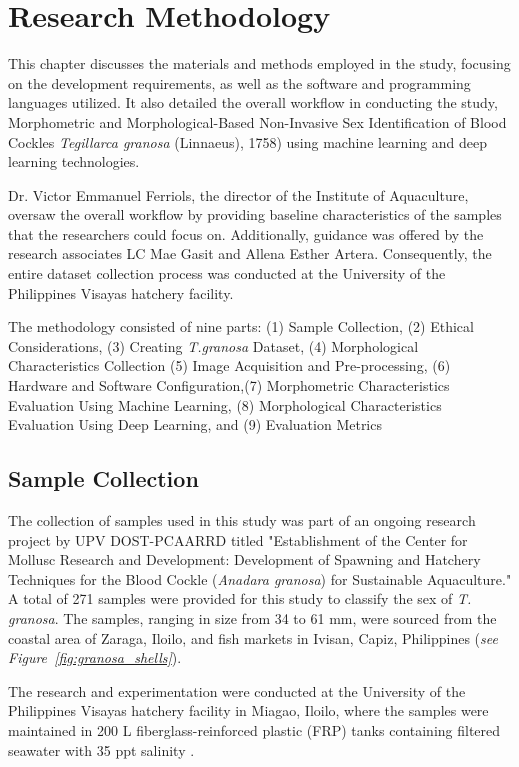 \chapter{Research Methodology}
\label{sec:methodology}

This chapter discusses the materials and methods employed in the study, focusing on the development requirements, as well as the software and programming languages utilized. It also detailed the overall workflow in conducting the study, Morphometric and Morphological-Based Non-Invasive Sex Identification of Blood Cockles \textit{Tegillarca granosa} (Linnaeus), 1758) using machine learning and deep learning technologies.

Dr. Victor Emmanuel Ferriols, the director of the Institute of Aquaculture, oversaw the overall workflow by providing baseline characteristics of the samples that the researchers could focus on. Additionally, guidance was offered by the research associates LC Mae Gasit and Allena Esther Artera. Consequently, the entire dataset collection process was conducted at the University of the Philippines Visayas hatchery facility.

The methodology consisted of nine parts: (1) Sample Collection, (2) Ethical Considerations, (3) Creating \textit{T.granosa} Dataset, (4) Morphological Characteristics Collection (5) Image Acquisition and Pre-processing, (6) Hardware and Software Configuration,(7) Morphometric Characteristics Evaluation Using Machine Learning, (8) Morphological Characteristics Evaluation Using Deep Learning, and (9) Evaluation Metrics

\section{Sample Collection}
\label{sec:samplecollect} 

The collection of \Tgranosa samples used in this study was part of an ongoing research project by UPV DOST-PCAARRD titled "Establishment of the Center for Mollusc Research and Development: Development of Spawning and Hatchery Techniques for the Blood Cockle (\textit{Anadara granosa}) for Sustainable Aquaculture." A total of 271 samples were provided for this study to classify the sex of \textit{T. granosa}. The samples, ranging in size from 34 to 61 mm, were sourced from the coastal area of Zaraga, Iloilo, and fish markets in Ivisan, Capiz, Philippines (\textit{see Figure~\ref{fig:granosa_shells}}).

The research and experimentation were conducted at the University of the Philippines Visayas hatchery facility in Miagao, Iloilo, where the samples were maintained in 200 L fiberglass-reinforced plastic (FRP) tanks containing filtered seawater with 35 ppt salinity \cite{miranda2023}.

